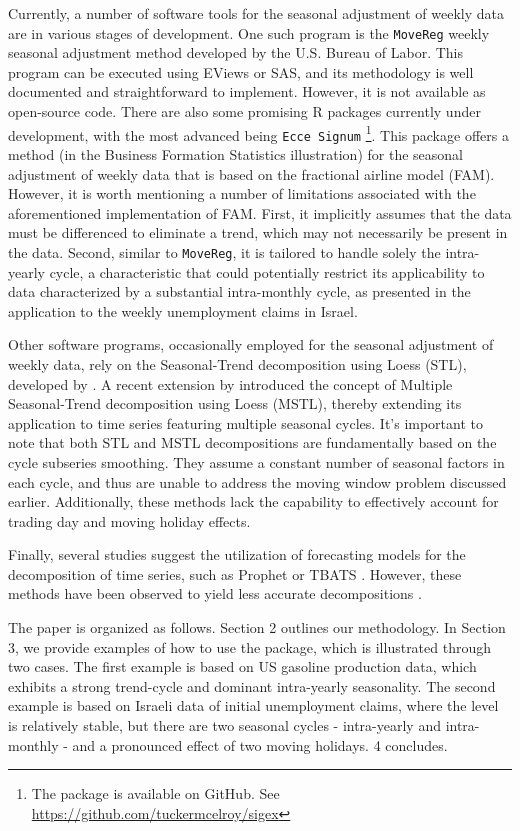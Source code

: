 Currently, a number of software tools for the seasonal adjustment of weekly data are in various stages of development. One such program is the \texttt{MoveReg} weekly seasonal adjustment method developed by the U.S. Bureau of Labor. This program can be executed using EViews or SAS, and its methodology is well documented and straightforward to implement. However, it is not available as open-source code. There are also some promising R packages currently under development, with the most advanced being \texttt{Ecce\ Signum} \citep{mcelroy2022}\footnote{The package is available on GitHub. See \url{https://github.com/tuckermcelroy/sigex}}. This package offers a method (in the Business Formation Statistics illustration) for the seasonal adjustment of weekly data that is based on the fractional airline model (FAM). However, it is worth mentioning a number of limitations associated with the aforementioned implementation of FAM. First, it implicitly assumes that the data must be differenced to eliminate a trend, which may not necessarily be present in the data. Second, similar to \texttt{MoveReg}, it is tailored to handle solely the intra-yearly cycle, a characteristic that could potentially restrict its applicability to data characterized by a substantial intra-monthly cycle, as presented in the application to the weekly unemployment claims in Israel.

Other software programs, occasionally employed for the seasonal adjustment of weekly data, rely on the Seasonal-Trend decomposition using Loess (STL), developed by \citet{cleveland1990stl}. A recent extension by \citet{bandara2021mstl} introduced the concept of Multiple Seasonal-Trend decomposition using Loess (MSTL), thereby extending its application to time series featuring multiple seasonal cycles. It's important to note that both STL and MSTL decompositions are fundamentally based on the cycle subseries smoothing. They assume a constant number of seasonal factors in each cycle, and thus are unable to address the moving window problem discussed earlier. Additionally, these methods lack the capability to effectively account for trading day and moving holiday effects.

Finally, several studies suggest the utilization of forecasting models for the decomposition of time series, such as Prophet \citep{prophet} or TBATS \citep{tbats}. However, these methods have been observed to yield less accurate decompositions \citep{bandara2021mstl}.

The paper is organized as follows. Section 2 outlines our methodology. In Section 3, we provide examples of how to use the  package, which is illustrated through two cases. The first example is based on US gasoline production data, which exhibits a strong trend-cycle and dominant intra-yearly seasonality. The second example is based on Israeli data of initial unemployment claims, where the level is relatively stable, but there are two seasonal cycles - intra-yearly and intra-monthly - and a pronounced effect of two moving holidays. 4 concludes.


